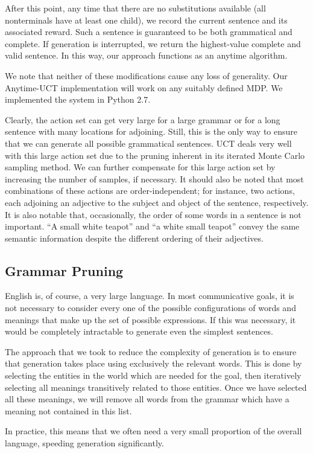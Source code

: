 After this point, any time that there are no substitutions
available (all nonterminals have at least one child), we record the
current sentence and its associated reward.  Such a sentence is
guaranteed to be both grammatical and complete.  If generation is
interrupted, we return the highest-value complete and valid sentence.
In this way, our approach functions as an anytime algorithm.

We note that neither of these modifications cause any loss of
generality.  Our Anytime-UCT implementation will work on any suitably
defined MDP.  We implemented the system in Python 2.7.

 Clearly, the action set can get very large for a large grammar or for
 a long sentence with many locations for adjoining.  Still, this is the
 only way to ensure that we can generate all possible grammatical
 sentences.  UCT deals very well with this large action set due to the
 pruning inherent in its iterated Monte Carlo sampling method.  We can
 further compensate for this large action set by increasing the number
 of samples, if necessary.  It should also be noted that most
 combinations of these actions are order-independent; for instance, two
 actions, each adjoining an adjective to the subject and object of the
 sentence, respectively.  It is also notable that, occasionally, the
 order of some words in a sentence is not important.  ``A small white
 teapot'' and ``a white small teapot'' convey the same semantic
 information despite the different ordering of their adjectives.

\subsection{Grammar Pruning}

English is, of course, a very large language.  In most communicative goals, it is
not necessary to consider every one of the possible configurations of words and
meanings that make up the set of possible expressions.  If this was necessary,
it would be completely intractable to generate even the simplest sentences.

The approach that we took to reduce the complexity of generation is to ensure that
generation takes place using exclusively the relevant words.  This is done by selecting
the entities in the world which are needed for the goal, then iteratively selecting all
meanings transitively related to those entities.  Once we have selected all these meanings,
we will remove all words from the grammar which have a meaning not contained in this list.

In practice, this means that we often need a very small proportion of the overall language,
speeding generation significantly.